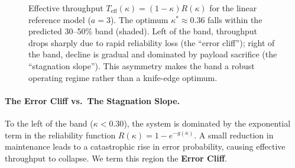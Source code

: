\documentclass[11pt,twocolumn]{article}
\begin{document}
\begin{figure}[!htb]
  \centering
  \caption{Effective throughput $T_{\mathrm{eff}}(\kappa) = (1-\kappa)R(\kappa)$ for the linear reference model ($a=3$). The optimum $\kappa^* \approx 0.36$ falls within the predicted 30--50\% band (shaded). Left of the band, throughput drops sharply due to rapid reliability loss (the ``error cliff''); right of the band, decline is gradual and dominated by payload sacrifice (the ``stagnation slope''). This asymmetry makes the band a robust operating regime rather than a knife-edge optimum.}
  \label{fig:landscape}
\end{figure}

\paragraph{The Error Cliff vs.\ The Stagnation Slope.}
To the left of the band ($\kappa < 0.30$), the system is dominated by the exponential term in the reliability function $R(\kappa) = 1 - e^{-g(\kappa)}$. A small reduction in maintenance leads to a catastrophic rise in error probability, causing effective throughput to collapse. We term this region the \textbf{Error Cliff}.
\end{document}
